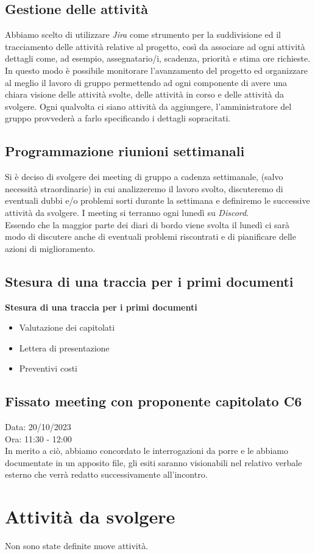 \documentclass{article}
\begin{document}
\subsection{Gestione delle attività}
Abbiamo scelto di utilizzare \textit{Jira} come strumento per la suddivisione ed il tracciamento delle attività relative al progetto, così da associare ad ogni attività dettagli come, ad esempio, assegnatario/i, scadenza, priorità e stima ore richieste. \\
In questo modo è possibile monitorare l'avanzamento del progetto ed organizzare al meglio il lavoro di gruppo permettendo ad ogni componente di avere una chiara visione delle attività svolte, delle attività in corso e delle attività da svolgere.
Ogni qualvolta ci siano attività da aggiungere, l’amministratore del gruppo provvederà a farlo specificando i dettagli sopracitati.
\subsection{Programmazione riunioni settimanali}
Si è deciso di svolgere dei meeting di gruppo a cadenza settimanale, (salvo necessità straordinarie) in cui analizzeremo il lavoro svolto, discuteremo di eventuali dubbi e/o problemi sorti durante la settimana e definiremo le successive attività da svolgere.
I meeting si terranno ogni lunedì su \textit{Discord}. \\
Essendo che la maggior parte dei diari di bordo viene svolta il lunedì ci sarà modo di discutere anche di eventuali problemi riscontrati e di pianificare delle azioni di miglioramento.
\subsection{Stesura di una traccia per i primi documenti}
\item \textbf{\fontsize{12}{6}\selectfont Stesura di una traccia per i primi documenti}
\begin{itemize}
\item Valutazione dei capitolati \item Lettera di presentazione \item Preventivi costi
\end{itemize}
\subsection{Fissato meeting con proponente capitolato C6} Data: 20/10/2023 \\
Ora: 11:30 - 12:00 \\
In merito a ciò, abbiamo concordato le interrogazioni da porre e le abbiamo documentate in un apposito file, gli esiti saranno visionabili nel relativo verbale esterno che verrà redatto successivamente all'incontro.

\section{Attività da svolgere}
Non sono state definite nuove attività.
\end{document}
